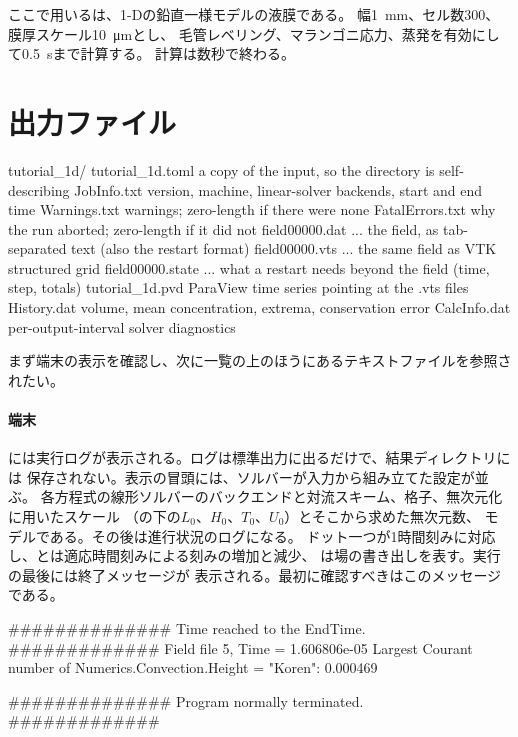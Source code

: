 ここで用いるは、1-Dの鉛直一様モデルの液膜である。
幅\SI{1}{\milli\metre}、セル数\SI{300}{}、膜厚スケール\SI{10}{\micro\metre}とし、
毛管レベリング、マランゴニ応力、蒸発を有効にして\SI{0.5}{\second}まで計算する。
計算は数秒で終わる。

\section{出力ファイル}
\label{sec:firstrun:output}

\begin{plain}
tutorial_1d/
  tutorial_1d.toml        a copy of the input, so the directory is self-describing
  JobInfo.txt             version, machine, linear-solver backends, start and end time
  Warnings.txt            warnings; zero-length if there were none
  FatalErrors.txt         why the run aborted; zero-length if it did not
  field00000.dat ...      the field, as tab-separated text (also the restart format)
  field00000.vts ...      the same field as VTK structured grid
  field00000.state ...    what a restart needs beyond the field (time, step, totals)
  tutorial_1d.pvd         ParaView time series pointing at the .vts files
  History.dat             volume, mean concentration, extrema, conservation error
  CalcInfo.dat            per-output-interval solver diagnostics
\end{plain}

まず端末の表示を確認し、次に一覧の上のほうにあるテキストファイルを参照されたい。

\paragraph{端末}には実行ログが表示される。ログは標準出力に出るだけで、結果ディレクトリには
保存されない。表示の冒頭には、ソルバーが入力から組み立てた設定が並ぶ。
各方程式の線形ソルバーのバックエンドと対流スキーム、格子、無次元化に用いたスケール
（の下の$L_0$、$H_0$、$T_0$、$U_0$）とそこから求めた無次元数、
モデルである。その後は進行状況のログになる。
ドット一つが1時間刻みに対応し、とは適応時間刻みによる刻みの増加と減少、
は場の書き出しを表す。実行の最後には終了メッセージが
表示される。最初に確認すべきはこのメッセージである。

\begin{plain}
############## Time reached to the EndTime. #############
Field file 5, Time = 1.606806e-05
Largest Courant number of Numerics.Convection.Height = "Koren": 0.000469

############## Program normally terminated. #############
\end{plain}

